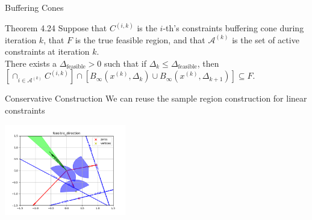 \documentclass{beamer}
\newcommand{\xk}{{{x}^{(k)}}}
\newcommand{\dk}{{\Delta_k}}
\begin{document}
\begin{frame}{Buffering Cones}
	\begin{block}{Theorem 4.24}
		Suppose that $C^{(i, k)}$ is the $i$-th's constraints buffering cone during iteration $k$,
		that $F$ is the true feasible region,
		and that $\mathcal A^{(k)}$ is the set of active constraints at iteration $k$. \\
		There exists a $\Delta_{\textrm{feasible}} > 0$ such that
		if $\Delta_k \le \Delta_{\textrm{feasible}}$, then 
		$\left[\cap_{i \in \mathcal A^{(k)}} C^{(i, k)} \right] \cap \left[B_{\infty}\left(\xk, \Delta_{k}\right) \cup B_{\infty}\left(\xk, \Delta_{k+1}\right)\right] \subseteq F$.
	\end{block}
\end{frame}

\begin{frame}{Conservative Construction}
	We can reuse the sample region construction for linear constraints
	\begin{center}
		\includegraphics[width=200px]{images/feasible_direction.png}
	\end{center}
\end{frame}



\end{document}
